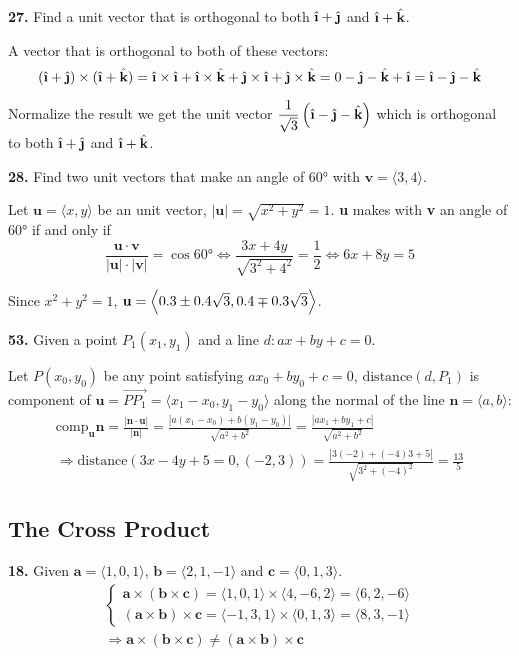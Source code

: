 \documentclass[a4paper,12pt]{article}
\newcommand{\unit}[1]{\hat{\textbf #1}}
\newcommand{\exercise}[1]{\noindent\textbf{#1.}}
\begin{document}
\exercise{27} Find a unit vector that is orthogonal to both
$\unit\i + \unit\j$ and $\unit\i + \unit k$.

A vector that is orthogonal to both of these vectors:
\[(\unit\i + \unit\j)\times(\unit\i + \unit k)
= \unit\i\times\unit\i + \unit\i\times\unit k
+ \unit\j\times\unit\i + \unit\j\times\unit k
= 0 - \unit\j - \unit k + \unit\i
= \unit\i - \unit\j - \unit k\]

Normalize the result we get the unit vector $\dfrac{1}{\sqrt 3}\left(\unit\i
- \unit\j - \unit k\right)$ which is orthogonal to both $\unit\i + \unit\j$
and $\unit\i + \unit k$.

\exercise{28} Find two unit vectors that make an angle of \ang{60}
with $\mathbf{v} = \langle 3, 4 \rangle$.

Let $\mathbf{u} = \langle x, y \rangle$ be an unit vector,
$|\mathbf{u}| = \sqrt{x^2 + y^2} = 1$.  \textbf{u} makes with
\textbf{v} an angle of \ang{60} if and only if
\[\frac{\mathbf{u}\cdot\mathbf{v}}{|\mathbf{u}|\cdot|\mathbf{v}|} = \cos\ang{60}
\iff \frac{3x + 4y}{\sqrt{3^2 + 4^2}} = \frac{1}{2}
\iff 6x + 8y = 5\]

Since $x^2 + y^2 = 1$, $\mathbf{u} = \Bigl<0.3 \pm 0.4\sqrt 3,
0.4 \mp 0.3\sqrt 3\Bigr>$.

\exercise{53} Given a point $P_1\left(x_1, y_1\right)$ and a line
$d: ax + by + c = 0$.

Let $P\left(x_0, y_0\right)$ be any point satisfying $ax_0 + by_0 + c = 0$,
$\mathrm{distance}\left(d, P_1\right)$ is component of $\mathbf{u} =
\overrightarrow{PP_1} = \langle x_1 - x_0, y_1 - y_0 \rangle$ along the normal
of the line $\mathbf{n} = \langle a, b \rangle$:
\begin{multline*}
  \mathrm{comp}_\mathbf{u}\mathbf{n}
= \frac{|\mathbf{n}\cdot\mathbf{u}|}{|\mathbf{n}|}
= \frac{\left|a\left(x_1 - x_0\right) + b\left(y_1 - y_0\right)\right|}
       {\sqrt{a^2 + b^2}}
= \frac{\left|ax_1 + by_1 + c\right|}{\sqrt{a^2 + b^2}}\\
\Longrightarrow \mathrm{distance}\left(3x - 4y + 5 = 0, (-2, 3)\right)
= \frac{\left|3(-2) + (-4)3 + 5\right|}{\sqrt{3^2 + (-4)^2}}
= \frac{13}{5}
\end{multline*}

\subsection{The Cross Product}
\exercise{18} Given $\mathbf{a} = \langle 1, 0, 1 \rangle$,
$\mathbf{b} = \langle 2, 1, -1 \rangle$ and
$\mathbf{c} = \langle 0, 1, 3 \rangle$.
\begin{multline*}
  \begin{cases}
    \mathbf{a}\times(\mathbf{b}\times\mathbf{c})
    = \langle 1, 0, 1 \rangle \times \langle 4, -6, 2 \rangle
    = \langle 6, 2, -6 \rangle\\
    (\mathbf{a}\times\mathbf{b})\times\mathbf{c}
    = \langle -1, 3, 1 \rangle \times \langle 0, 1, 3 \rangle
    = \langle 8, 3, -1 \rangle
  \end{cases}\\
  \Longrightarrow \mathbf{a}\times(\mathbf{b}\times\mathbf{c})
             \neq (\mathbf{a}\times\mathbf{b})\times\mathbf{c}
\end{multline*}
\end{document}
